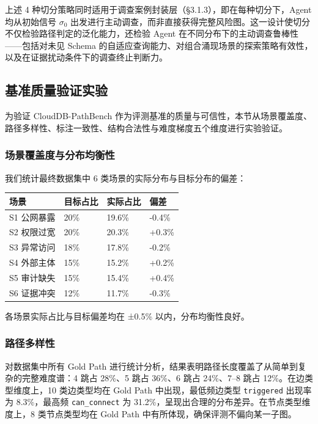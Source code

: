 \documentclass[a4paper,12pt]{ctexart}
\begin{document}
上述 4 种切分策略同时适用于调查案例封装层（§3.1.3），即在每种切分下，Agent 均从初始信号 $\sigma_0$ 出发进行主动调查，而非直接获得完整风险图。这一设计使切分不仅检验路径判定的泛化能力，还检验 Agent 在不同分布下的主动调查鲁棒性——包括对未见 Schema 的自适应查询能力、对组合涌现场景的探索策略有效性，以及在证据扰动条件下的调查终止判断力。

\subsection{基准质量验证实验}

为验证 CloudDB-PathBench 作为评测基准的质量与可信性，本节从场景覆盖度、路径多样性、标注一致性、结构合法性与难度梯度五个维度进行实验验证。

\subsubsection{场景覆盖度与分布均衡性}

我们统计最终数据集中 6 类场景的实际分布与目标分布的偏差：

\begin{table}[htbp]
\centering
\small
\setlength{\tabcolsep}{4pt}
\begin{tabular}{|l|l|l|l|}
\hline
\textbf{场景} & \textbf{目标占比} & \textbf{实际占比} & \textbf{偏差} \\
\hline
S1 公网暴露 & 20\% & 19.6\% & -0.4\% \\
\hline
S2 权限过宽 & 20\% & 20.3\% & +0.3\% \\
\hline
S3 异常访问 & 18\% & 17.8\% & -0.2\% \\
\hline
S4 外部主体 & 15\% & 15.2\% & +0.2\% \\
\hline
S5 审计缺失 & 15\% & 15.4\% & +0.4\% \\
\hline
S6 证据冲突 & 12\% & 11.7\% & -0.3\% \\
\hline
\end{tabular}
\end{table}

各场景实际占比与目标偏差均在 ±0.5\% 以内，分布均衡性良好。

\subsubsection{路径多样性}

对数据集中所有 Gold Path 进行统计分析，结果表明路径长度覆盖了从简单到复杂的完整难度谱：4 跳占 28\%、5 跳占 36\%、6 跳占 24\%、7–8 跳占 12\%。在边类型维度上，10 类边类型均在 Gold Path 中出现，最低频边类型 \texttt{triggered} 出现率为 8.3\%，最高频 \texttt{can\_connect} 为 31.2\%，呈现出合理的分布差异。在节点类型维度上，8 类节点类型均在 Gold Path 中有所体现，确保评测不偏向某一子图。
\end{document}
